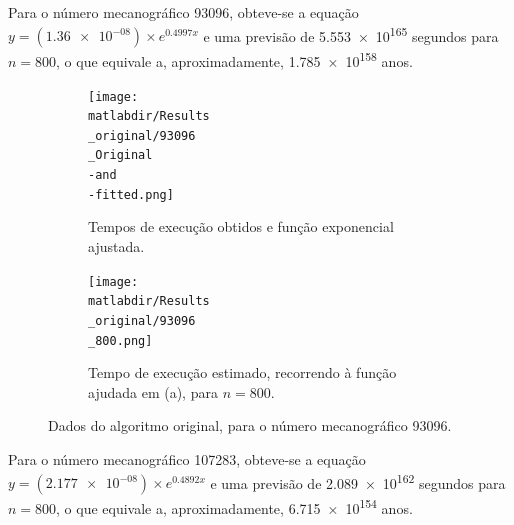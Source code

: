 \documentclass[portuguese,11pt,a4paper,titlepage]{article}
\newcommand{\matlabdir}{"../MATLAB-fittings"}
\begin{document}
Para o número mecanográfico 93096, obteve-se a equação \begin{math}y = (\num{1.36e-08})\times e^{0.4997x}\end{math}
e uma previsão de \num{5.553e+165} segundos para \begin{math}n = 800\end{math}, o que equivale a, aproximadamente, \num{1.785e+158} anos.

\begin{figure}[h]
	\begin{subfigure}{0.47\textwidth}
	\texttt{[image: \\matlabdir/Results\\\_original/93096\\\_Original\\-and\\-fitted.png]} 
	\caption{Tempos de execução obtidos e função exponencial ajustada.}
	\label{fig:subim1}
	\end{subfigure}
	\hspace{0.049\textwidth}
	\begin{subfigure}{0.47\textwidth}
	\texttt{[image: \\matlabdir/Results\\\_original/93096\\\_800.png]}
	\caption{Tempo de execução estimado, recorrendo à função ajudada em (a), para \begin{math}n=800\end{math}.}
	\label{fig:original_800}
	\end{subfigure}
	
	\caption{Dados do algoritmo original, para o número mecanográfico 93096.}
	\vspace{-20pt}
	\label{fig:original93096}
\end{figure}

\pagebreak
Para o número mecanográfico 107283, obteve-se a equação \begin{math}y = (\num{2.177e-08})\times e^{0.4892x}\end{math}
e uma previsão de \num{2.089e+162} segundos para \begin{math}n = 800\end{math}, o que equivale a, aproximadamente, \num{6.715e+154} anos.
\end{document}
